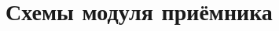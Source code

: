 \documentclass[utf8x, 14pt, oneside, a4paper]{article}
\begin{document}
	
%		
	
	
	
	\section{Схемы модуля приёмника}\label{app:receiver}
	\pagebreak
%	
%	
	\pagebreak
	

	
	
	
\end{document}
